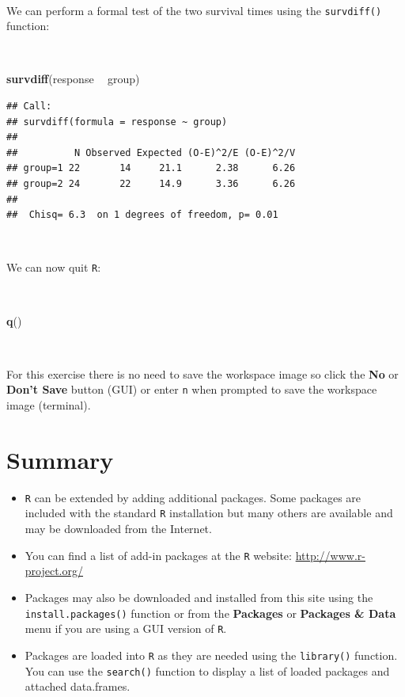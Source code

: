 \documentclass[12pt,a4paper]{book}
\newenvironment{Shaded}{\begin{snugshade}}{\end{snugshade}}
\newcommand{\KeywordTok}[1]{\textcolor[rgb]{0.13,0.29,0.53}{\textbf{#1}}}
\newcommand{\StringTok}[1]{\textcolor[rgb]{0.31,0.60,0.02}{#1}}
\newcommand{\OperatorTok}[1]{\textcolor[rgb]{0.81,0.36,0.00}{\textbf{#1}}}
\newcommand{\NormalTok}[1]{#1}
\theoremstyle{definition}
\theoremstyle{definition}
\theoremstyle{definition}
\theoremstyle{remark}
\begin{document}
~

We can perform a formal test of the two survival times using the
\texttt{survdiff()} function:

~

\begin{Shaded}
\begin{Highlighting}[]
\KeywordTok{survdiff}\NormalTok{(response }\OperatorTok{~}\StringTok{ }\NormalTok{group)}
\end{Highlighting}
\end{Shaded}

\begin{verbatim}
## Call:
## survdiff(formula = response ~ group)
## 
##          N Observed Expected (O-E)^2/E (O-E)^2/V
## group=1 22       14     21.1      2.38      6.26
## group=2 24       22     14.9      3.36      6.26
## 
##  Chisq= 6.3  on 1 degrees of freedom, p= 0.01
\end{verbatim}

~

We can now quit \texttt{R}:

~

\begin{Shaded}
\begin{Highlighting}[]
\KeywordTok{q}\NormalTok{()}
\end{Highlighting}
\end{Shaded}

~

For this exercise there is no need to save the workspace image so click
the \textbf{No} or \textbf{Don't Save} button (GUI) or enter \texttt{n}
when prompted to save the workspace image (terminal).

\hypertarget{summary-4}{%
\section{Summary}\label{summary-4}}

\begin{itemize}
\item
  \texttt{R} can be extended by adding additional packages. Some
  packages are included with the standard \texttt{R} installation but
  many others are available and may be downloaded from the Internet.
\item
  You can find a list of add-in packages at the \texttt{R} website:
  \url{http://www.r-project.org/}
\item
  Packages may also be downloaded and installed from this site using the
  \texttt{install.packages()} function or from the \textbf{Packages} or
  \textbf{Packages \& Data} menu if you are using a GUI version of
  \texttt{R}.
\item
  Packages are loaded into \texttt{R} as they are needed using the
  \texttt{library()} function. You can use the \texttt{search()}
  function to display a list of loaded packages and attached
  data.frames.
\end{itemize}
\end{document}
